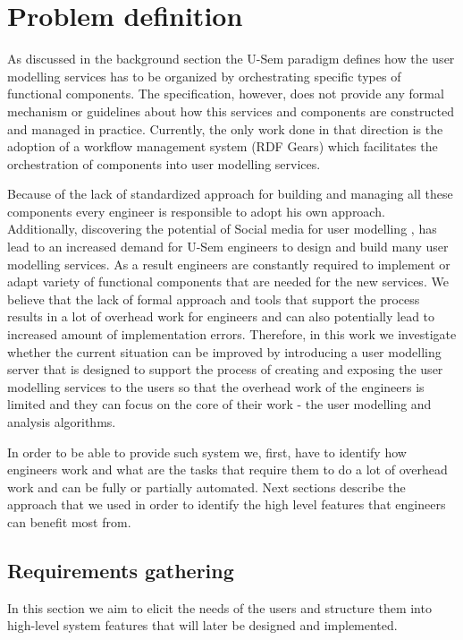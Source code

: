 
\chapter{Problem definition}

As discussed in the background section the U-Sem paradigm defines how the user modelling services has to be organized by orchestrating specific types of functional components. The specification, however, does not provide any formal mechanism or guidelines about how this services and components are constructed and managed in practice. Currently, the only work done in that direction is the adoption of a workflow management system (RDF Gears) which facilitates the orchestration of components into user modelling services. 

Because of the lack of standardized approach for building and managing all these components every engineer is responsible to adopt his own approach. Additionally, discovering the potential of Social media for user modelling \cite{brusilovsky2007adaptive}, has lead to an increased demand for U-Sem engineers to design and build many user modelling services. As a result engineers are constantly required to implement or adapt variety of functional components that are needed for the new services. We believe that the lack of formal approach and tools that support the process results in a lot of overhead work for engineers and can also potentially lead to increased amount of implementation errors. Therefore, in this work we investigate whether the current situation can be improved by introducing a user modelling server that is designed to support the process of creating and exposing the user modelling services to the users so that the overhead work of the engineers is limited and they can focus on the core of their work - the user modelling and analysis algorithms.

In order to be able to provide such system we, first, have to identify how engineers work and what are the tasks that require them to do a lot of overhead work and can be fully or partially automated. Next sections describe the approach that we used in order to identify the high level features that engineers can benefit most from.

\section{Requirements gathering}

In this section we aim to elicit the needs of the users and structure them into high-level system features that will later be designed and implemented.

